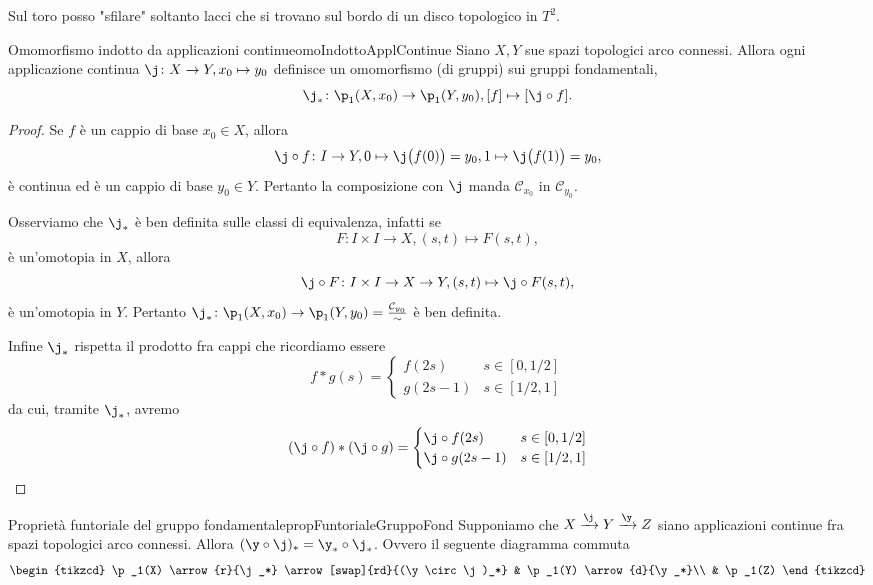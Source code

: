 \begin{ese}
	Sul toro posso "sfilare" soltanto lacci che si trovano sul bordo di un disco topologico in \(T^2\).
\end{ese}
%
%
\begin{prop}{Omomorfismo indotto da applicazioni continue}{omoIndottoApplContinue}
	Siano \(X,Y\) sue spazi topologici arco connessi.
	Allora ogni applicazione continua \(\j\colon X \to Y, x_0 \mapsto y_0\) definisce un omomorfismo (di gruppi) sui gruppi fondamentali,
	\[
		\j_* \colon \p_1(X,x_0) \to \p_1(Y,y_0), [f] \mapsto [\j\circ f].
	\]
\end{prop}

\begin{proof}
	Se \(f\) è un cappio di base \(x_0\in X\), allora
	\[
		\j \circ f\colon I \to Y, 0\mapsto \j\big(f(0)\big) = y_0, 1\mapsto \j\big(f(1)\big)=y_0,
	\]
	è continua ed è un cappio di base \(y_0\in Y\).
	Pertanto la composizione con \(\j\) manda \(\mathcal{C}_{x_0}\) in \(\mathcal{C}_{y_0}\).

	Osserviamo che \(\j_*\) è ben definita sulle classi di equivalenza, infatti se
	\[
		F\colon I \times I \to X, (s,t) \mapsto F(s,t),
	\]
	è un'omotopia in \(X\), allora
	\[
		\j \circ F \colon I\times I \to X \to Y, (s,t) \mapsto \j\circ F(s,t),
	\]
	è un'omotopia in \(Y\).
	Pertanto \(\j_*\colon \p_1(X,x_0) \to \p_1(Y,y_0) = \frac{\mathcal{C}_{y_0}}{\sim}\) è ben definita.

	Infine \(\j_*\) rispetta il prodotto fra cappi che ricordiamo essere
	\[
		f*g(s) = 	\begin{cases}
			f(2s)   & s\in[0,1/2] \\
			g(2s-1) & s\in[1/2,1]
		\end{cases}
	\]
	da cui, tramite \(\j_*\), avremo
	\[
		(\j\circ f)*(\j\circ g) = 	\begin{cases}
			\j\circ f(2s)   & s\in[0,1/2] \\
			\j\circ g(2s-1) & s\in[1/2,1]
		\end{cases}
	\]
\end{proof}

\begin{teor}{Proprietà funtoriale del gruppo fondamentale}{propFuntorialeGruppoFond}
	Supponiamo che \(X \xrightarrow{\j} Y \xrightarrow{\y} Z\) siano applicazioni continue fra spazi topologici arco connessi.
	Allora \((\y\circ \j)_* = \y_* \circ \j_*\).
	Ovvero il seguente diagramma commuta
	\[
		\begin{tikzcd}
			\p_1(X) \arrow{r}{\j_*} \arrow[swap]{rd}{(\y\circ \j)_*} & \p_1(Y) \arrow{d}{\y_*}\\
			& \p_1(Z)
		\end{tikzcd}
	\]
\end{teor}

